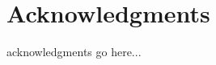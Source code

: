 




\begingroup
\let\clearpage\relax
\let\cleardoublepage\relax
\let\cleardoublepage\relax
\chapter*{Acknowledgments}
acknowledgments go here...

\endgroup



